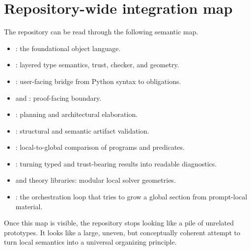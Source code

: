 \section*{Repository-wide integration map}
The repository can be read through the following semantic map.
\begin{itemize}[leftmargin=2em, itemsep=0.5em]
  \item {}: the foundational object language.
  \item {}: layered type semantics, trust, checker, and geometry.
  \item {}: user-facing bridge from Python syntax to obligations.
  \item {} and : proof-facing boundary.
  \item {}: planning and architectural elaboration.
  \item {}: structural and semantic artifact validation.
  \item {}: local-to-global comparison of programs and predicates.
  \item {}: turning typed and trust-bearing results into readable diagnostics.
  \item {} and theory libraries: modular local solver geometries.
  \item {}: the orchestration loop that tries to grow a global section from prompt-local material.
\end{itemize}

Once this map is visible, the repository stops looking like a pile of unrelated prototypes.
It looks like a large, uneven, but conceptually coherent attempt to turn local semantics
into a universal organizing principle.
